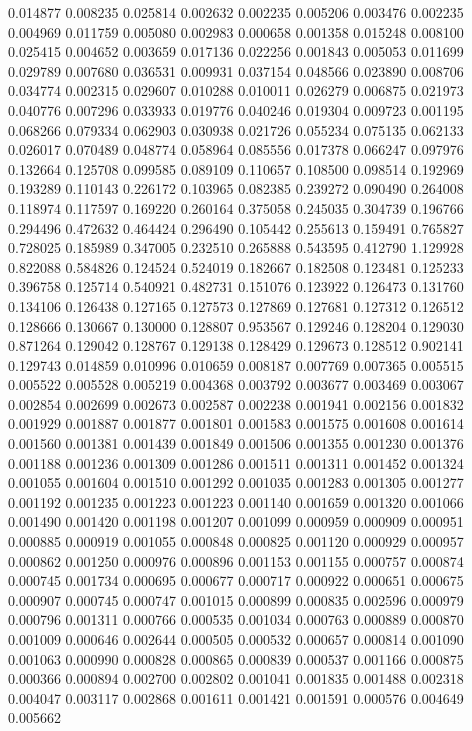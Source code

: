 0.014877
0.008235
0.025814
0.002632
0.002235
0.005206
0.003476
0.002235
0.004969
0.011759
0.005080
0.002983
0.000658
0.001358
0.015248
0.008100
0.025415
0.004652
0.003659
0.017136
0.022256
0.001843
0.005053
0.011699
0.029789
0.007680
0.036531
0.009931
0.037154
0.048566
0.023890
0.008706
0.034774
0.002315
0.029607
0.010288
0.010011
0.026279
0.006875
0.021973
0.040776
0.007296
0.033933
0.019776
0.040246
0.019304
0.009723
0.001195
0.068266
0.079334
0.062903
0.030938
0.021726
0.055234
0.075135
0.062133
0.026017
0.070489
0.048774
0.058964
0.085556
0.017378
0.066247
0.097976
0.132664
0.125708
0.099585
0.089109
0.110657
0.108500
0.098514
0.192969
0.193289
0.110143
0.226172
0.103965
0.082385
0.239272
0.090490
0.264008
0.118974
0.117597
0.169220
0.260164
0.375058
0.245035
0.304739
0.196766
0.294496
0.472632
0.464424
0.296490
0.105442
0.255613
0.159491
0.765827
0.728025
0.185989
0.347005
0.232510
0.265888
0.543595
0.412790
1.129928
0.822088
0.584826
0.124524
0.524019
0.182667
0.182508
0.123481
0.125233
0.396758
0.125714
0.540921
0.482731
0.151076
0.123922
0.126473
0.131760
0.134106
0.126438
0.127165
0.127573
0.127869
0.127681
0.127312
0.126512
0.128666
0.130667
0.130000
0.128807
0.953567
0.129246
0.128204
0.129030
0.871264
0.129042
0.128767
0.129138
0.128429
0.129673
0.128512
0.902141
0.129743
0.014859
0.010996
0.010659
0.008187
0.007769
0.007365
0.005515
0.005522
0.005528
0.005219
0.004368
0.003792
0.003677
0.003469
0.003067
0.002854
0.002699
0.002673
0.002587
0.002238
0.001941
0.002156
0.001832
0.001929
0.001887
0.001877
0.001801
0.001583
0.001575
0.001608
0.001614
0.001560
0.001381
0.001439
0.001849
0.001506
0.001355
0.001230
0.001376
0.001188
0.001236
0.001309
0.001286
0.001511
0.001311
0.001452
0.001324
0.001055
0.001604
0.001510
0.001292
0.001035
0.001283
0.001305
0.001277
0.001192
0.001235
0.001223
0.001223
0.001140
0.001659
0.001320
0.001066
0.001490
0.001420
0.001198
0.001207
0.001099
0.000959
0.000909
0.000951
0.000885
0.000919
0.001055
0.000848
0.000825
0.001120
0.000929
0.000957
0.000862
0.001250
0.000976
0.000896
0.001153
0.001155
0.000757
0.000874
0.000745
0.001734
0.000695
0.000677
0.000717
0.000922
0.000651
0.000675
0.000907
0.000745
0.000747
0.001015
0.000899
0.000835
0.002596
0.000979
0.000796
0.001311
0.000766
0.000535
0.001034
0.000763
0.000889
0.000870
0.001009
0.000646
0.002644
0.000505
0.000532
0.000657
0.000814
0.001090
0.001063
0.000990
0.000828
0.000865
0.000839
0.000537
0.001166
0.000875
0.000366
0.000894
0.002700
0.002802
0.001041
0.001835
0.001488
0.002318
0.004047
0.003117
0.002868
0.001611
0.001421
0.001591
0.000576
0.004649
0.005662
